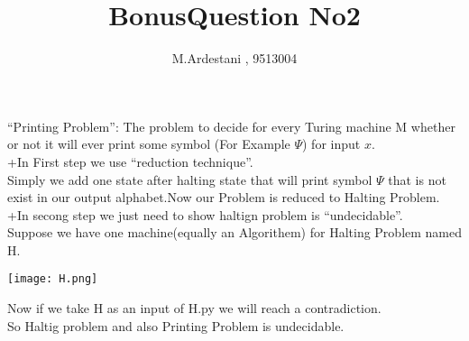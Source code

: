 \documentclass{article}
\begin{document}
\title{BonusQuestion No2 }
\author{M.Ardestani , 9513004}
\maketitle
\noindent ``Printing Problem'': The problem to decide for every Turing machine M whether or not it will ever print some symbol (For Example $\Psi$) for input  $x$.\\
+In First step we use ``reduction technique''.\\
Simply we add one state after halting state that will print symbol $\Psi$ that is not exist in our output alphabet.Now our Problem is reduced to Halting Problem.\\
+In secong step we just need to show haltign problem is ``undecidable''.\\
Suppose we have one machine(equally an Algorithem) for Halting Problem named H.\\
\vspace{-\baselineskip}
\vspace{-\baselineskip}
\begin{center}
\texttt{[image: H.png]}
\end{center}
Now if we take H as an input of H.py we will reach a contradiction.\\
So Haltig problem and also Printing Problem is undecidable.
\end{document}
